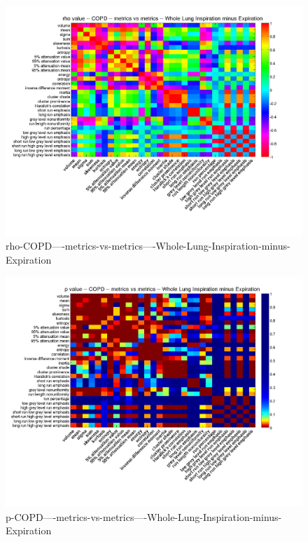 \documentclass[12pt]{article}
\begin{document}
\begin{figure}
    \includegraphics[width=0.84\linewidth,viewport=100 60 620 550]{corr/rho-COPD----metrics-vs-metrics----Whole-Lung-Inspiration-minus-Expiration.png}
    \caption{rho-COPD----metrics-vs-metrics----Whole-Lung-Inspiration-minus-Expiration}
    \label{fig:rho-COPD----metrics-vs-metrics----Whole-Lung-Inspiration-minus-Expiration}
\end{figure}
\begin{figure}
    \includegraphics[width=0.84\linewidth,viewport=100 60 620 550]{corr/p-COPD----metrics-vs-metrics----Whole-Lung-Inspiration-minus-Expiration.png}
    \caption{p-COPD----metrics-vs-metrics----Whole-Lung-Inspiration-minus-Expiration}
    \label{fig:p-COPD----metrics-vs-metrics----Whole-Lung-Inspiration-minus-Expiration}
\end{figure}
\end{document}
